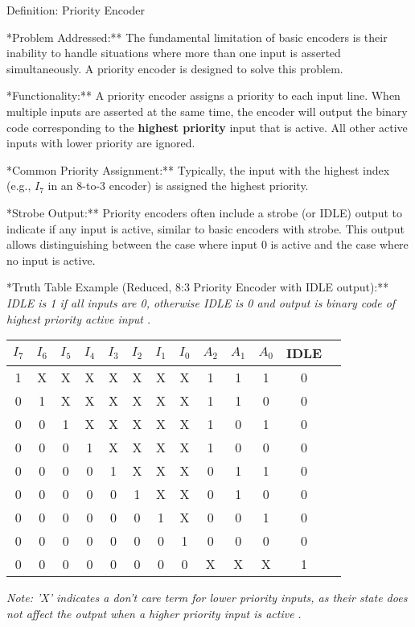 \documentclass{article}
\begin{document}
Definition: Priority Encoder

\item **Problem Addressed:** The fundamental limitation of basic encoders is their inability to handle situations where more than one input is asserted simultaneously. A priority encoder is designed to solve this problem.

\item **Functionality:** A priority encoder assigns a priority to each input line. When multiple inputs are asserted at the same time, the encoder will output the binary code corresponding to the \textbf{highest priority} input that is active. All other active inputs with lower priority are ignored.

\item **Common Priority Assignment:** Typically, the input with the highest index (e.g., $I_7$ in an 8-to-3 encoder) is assigned the highest priority.

\item **Strobe Output:** Priority encoders often include a strobe (or IDLE) output to indicate if any input is active, similar to basic encoders with strobe. This output allows distinguishing between the case where input 0 is active and the case where no input is active.

\item **Truth Table Example (Reduced, 8:3 Priority Encoder with IDLE output):** \textit{IDLE is 1 if all inputs are 0, otherwise IDLE is 0 and output is binary code of highest priority active input} \textit{.} \begin{tabular}{|ccccccccc|cccc|} \\ \hline $I_7$ & $I_6$ & $I_5$ & $I_4$ & $I_3$ & $I_2$ & $I_1$ & $I_0$ & $A_2$ & $A_1$ & $A_0$ & IDLE \\ \hline
 1 & X & X & X & X & X & X & X & 1 & 1 & 1 & 0 \\ 0 & 1 & X & X & X & X & X & X & 1 & 1 & 0 & 0 \\ 0 & 0 & 1 & X & X & X & X & X & 1 & 0 & 1 & 0 \\ 0 & 0 & 0 & 1 & X & X & X & X & 1 & 0 & 0 & 0 \\ 0 & 0 & 0 & 0 & 1 & X & X & X & 0 & 1 & 1 & 0 \\ 0 & 0 & 0 & 0 & 0 & 1 & X & X & 0 & 1 & 0 & 0 \\ 0 & 0 & 0 & 0 & 0 & 0 & 1 & X & 0 & 0 & 1 & 0 \\ 0 & 0 & 0 & 0 & 0 & 0 & 0 & 1 & 0 & 0 & 0 & 0 \\ 0 & 0 & 0 & 0 & 0 & 0 & 0 & 0 & X & X & X & 1 \\ \hline

\end{tabular}
 \textit{Note: 'X' indicates a don't care term for lower priority inputs, as their state does not affect the output when a higher priority input is active} \textit{.}
\end{document}
